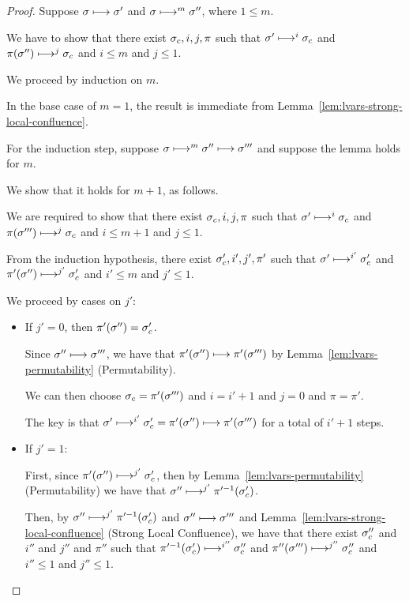 \begin{proof}
  Suppose $\sigma \longmapsto \sigma'$ and $\sigma \longmapsto^m
  \sigma''$, where $1 \leq m$.

  We have to show that there exist $\sigma_c, i, j, \pi$ such that
  $\sigma' \longmapsto^i \sigma_c$ and $\pi(\sigma'') \longmapsto^j
  \sigma_c$ and $i \leq m$ and $j \leq 1$.

  We proceed by induction on $m$.

  In the base case of $m = 1$, the result is immediate from
  Lemma~\ref{lem:lvars-strong-local-confluence}.

  For the induction step, suppose $\sigma \longmapsto^m \sigma''
  \longmapsto \sigma'''$ and suppose the lemma holds for $m$.

  We show that it holds for $m + 1$, as follows.

  We are required to show that there exist $\sigma_c, i, j, \pi$ such
  that $\sigma' \longmapsto^{i} \sigma_c$ and $\pi(\sigma''')
  \longmapsto^{j} \sigma_c$ and $i \leq m + 1$ and $j \leq 1$.

  From the induction hypothesis, there exist $\sigma_c', i', j', \pi'$
  such that $\sigma' \longmapsto^{i'} \sigma_c'$ and $\pi'(\sigma'')
  \longmapsto^{j'} \sigma_c'$ and $i' \leq m$ and $j' \leq 1$.

  We proceed by cases on $j'$:

  \begin{itemize}

  \item If $j' = 0$, then $\pi'(\sigma'') = \sigma_c'$.

    Since $\sigma'' \longmapsto \sigma'''$, we have that $\pi'(\sigma'')
    \longmapsto \pi'(\sigma''')$ by
    Lemma~\ref{lem:lvars-permutability} (Permutability).

    We can then choose $\sigma_c = \pi'(\sigma''')$ and $i = i' + 1$ and
    $j = 0$ and $\pi = \pi'$.

    The key is that $\sigma' \longmapsto^{i'} \sigma'_c = \pi'(\sigma'')
    \longmapsto \pi'(\sigma''')$ for a total of $i' + 1$ steps.
    
  \item If $j' = 1$:

    First, since $\pi'(\sigma'') \longmapsto^{j'} \sigma'_c$, then by
    Lemma~\ref{lem:lvars-permutability} (Permutability) we have that
    $\sigma'' \longmapsto^{j'} \pi'^{-1}(\sigma'_c)$.

    Then, by $\sigma'' \longmapsto^{j'} \pi'^{-1}(\sigma'_c)$ and
    $\sigma'' \longmapsto \sigma'''$ and
    Lemma~\ref{lem:lvars-strong-local-confluence} (Strong Local
    Confluence), we have that there exist $\sigma_c''$ and $i''$ and
    $j''$ and $\pi''$ such that $\pi'^{-1}(\sigma'_c)
    \longmapsto^{i''} \sigma_c''$ and $\pi''(\sigma''')
    \longmapsto^{j''} \sigma_c''$ and $i'' \leq 1$ and $j'' \leq 1$.


\end{itemize}
\end{proof}
